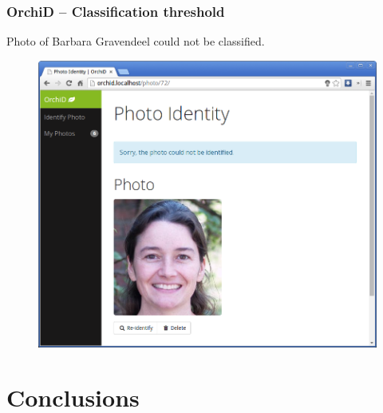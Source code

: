 \documentclass[]{beamer}
\begin{document}
    \begin{frame}[plain]
        \frametitle{OrchiD -- Classification threshold}

        Photo of Barbara Gravendeel could not be classified.

        \begin{figure}[!htb]
              \includegraphics[width=\linewidth]{OrchiD_Barbara}
            \endminipage\hfill
        \end{figure}
    \end{frame}


\section{Conclusions}
\end{document}
